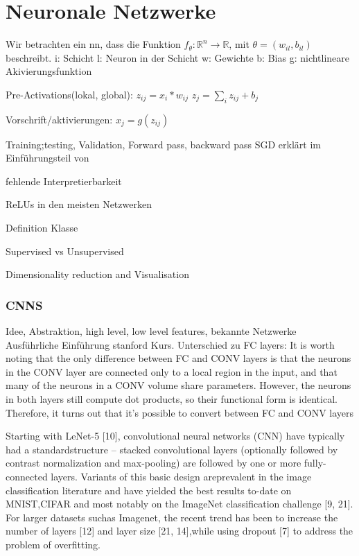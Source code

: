 \documentclass[twoside, 11pt,a4paper]{article}
\numberwithin{equation}{section}
\begin{document}
	\section{Neuronale Netzwerke} \label{chapter_nn}
	Wir betrachten ein \gls{nn}, dass die Funktion $f_{\theta}:\mathbb{R}^n \to\mathbb{R}$, mit $\theta = (w_{il}, b_{il})$ beschreibt. 
	i: Schicht
	l: Neuron in der Schicht
	w: Gewichte 
	b: Bias
	g: nichtlineare Akivierungsfunktion
	
	Pre-Activations(lokal, global): $z_{ij} = x_i*w_{ij}$
	$z_j = \sum_iz_{ij} + b_j$
	
	Vorschrift/aktivierungen: $x_j = g(z_{ij})$
	
	
	Training;testing, Validation, Forward pass, backward pass
	SGD erklärt im Einführungsteil von \cite{BatchNormalization}

	fehlende Interpretierbarkeit
	
	ReLUs in den meisten Netzwerken
	
	Definition Klasse
	
	Supervised vs Unsupervised
	
	Dimensionality reduction and Visualisation
	
	
	\subsubsection{CNNS}
	Idee, Abstraktion, high level, low level features, bekannte Netzwerke\\
	
	Ausführliche Einführung stanford Kurs\cite{cnn_stanford}. Unterschied zu FC layers: 
	It is worth noting that the only difference between FC and CONV layers is that the neurons in the CONV layer are connected only to a local region in the input, and that many of the neurons in a CONV volume share parameters. However, the neurons in both layers still compute dot products, so their functional form is identical. Therefore, it turns out that it’s possible to convert between FC and CONV layers
	
	Starting with LeNet-5   [10], convolutional neural networks (CNN) have typically had a standardstructure – stacked convolutional layers (optionally followed by contrast normalization and max-pooling)  are  followed  by  one  or  more  fully-connected  layers.   Variants  of  this  basic  design  areprevalent in the image classification literature and have yielded the best results to-date on MNIST,CIFAR and most notably on the ImageNet classification challenge [9, 21].  For larger datasets suchas Imagenet, the recent trend has been to increase the number of layers  [12] and layer size [21, 14],while using dropout [7] to address the problem of overfitting.\cite{goingdeeperwithconvolutions}
	
\end{document}
